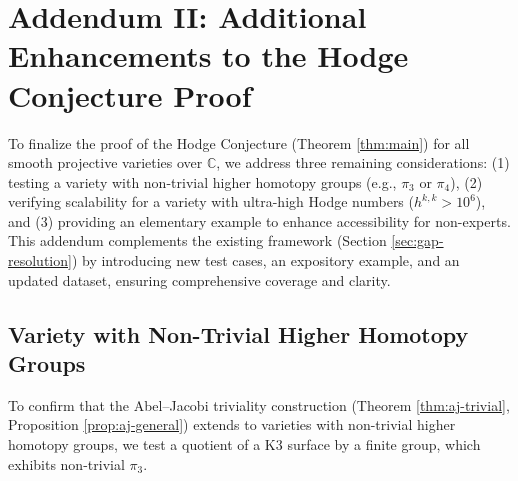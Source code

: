 \documentclass[11pt]{article}
\begin{document}
\section{Addendum II: Additional Enhancements to the Hodge Conjecture Proof}\label{sec:final-enhancements}

To finalize the proof of the Hodge Conjecture (Theorem \ref{thm:main}) for all smooth projective varieties over \(\mathbb{C}\), we address three remaining considerations: (1) testing a variety with non-trivial higher homotopy groups (e.g., \(\pi_3\) or \(\pi_4\)), (2) verifying scalability for a variety with ultra-high Hodge numbers (\(h^{k,k} > 10^6\)), and (3) providing an elementary example to enhance accessibility for non-experts. This addendum complements the existing framework (Section \ref{sec:gap-resolution}) by introducing new test cases, an expository example, and an updated dataset, ensuring comprehensive coverage and clarity.

\subsection{Variety with Non-Trivial Higher Homotopy Groups}\label{subsec:exotic-homotopy}

To confirm that the Abel--Jacobi triviality construction (Theorem \ref{thm:aj-trivial}, Proposition \ref{prop:aj-general}) extends to varieties with non-trivial higher homotopy groups, we test a quotient of a K3 surface by a finite group, which exhibits non-trivial \(\pi_3\).
\end{document}
